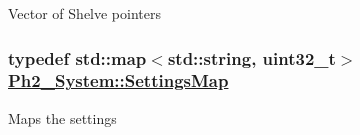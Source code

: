 Vector of Shelve pointers \hypertarget{namespace_ph2___system_f2bca61b7444e1e35ab6bccba079876b}{
\subsubsection[SettingsMap]{\setlength{\rightskip}{0pt plus 5cm}typedef std::map$<$std::string, uint32\_\-t$>$ \hyperlink{namespace_ph2___system_f2bca61b7444e1e35ab6bccba079876b}{Ph2\_\-System::Settings\-Map}}}
\label{namespace_ph2___system_f2bca61b7444e1e35ab6bccba079876b}


Maps the settings 